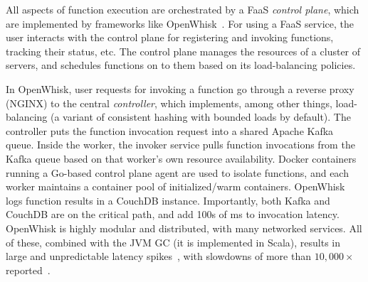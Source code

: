 All aspects of function execution are orchestrated by a FaaS \emph{control plane}, which are implemented by frameworks like OpenWhisk~\cite{openwhisk}.
For using a FaaS service, the user interacts with the control plane for registering and invoking functions, tracking their status, etc.
The control plane manages the resources of a cluster of servers, and schedules functions on to them based on its load-balancing policies.


In OpenWhisk, user requests for invoking a function go through a reverse proxy (NGINX) to the central \emph{controller}, which implements, among other things, load-balancing (a variant of consistent hashing with bounded loads by default).
The controller puts the function invocation request into a shared Apache Kafka~\cite{kafka} queue.
Inside the worker, the invoker service pulls function invocations from the Kafka queue based on that worker's own resource availability.
Docker containers running a Go-based control plane agent are used to isolate functions, and each worker maintains a container pool of initialized/warm containers.
OpenWhisk logs function results in a CouchDB instance.
Importantly, both Kafka and CouchDB are on the critical path, and add 100s of ms to invocation latency.
%
OpenWhisk is highly modular and distributed, with many networked services.
All of these, combined with the JVM GC (it is implemented in Scala), results in large and unpredictable latency spikes~\cite{faaslb-hpdc22, hotcarbon22-faas}, with slowdowns of more than $10,000\times$ reported~\cite{zuk_call_2022}. 

